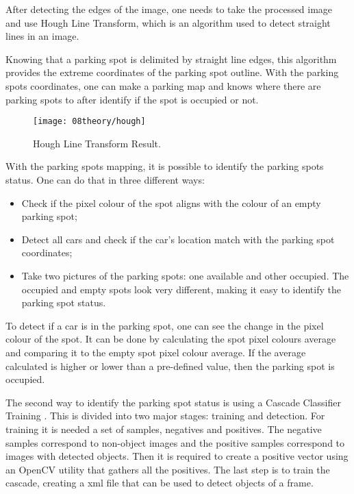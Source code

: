 After detecting the edges of the image, one needs to take the processed image and use Hough Line Transform, which is an algorithm used to detect straight lines in an image. \cite{hough} 

Knowing that a parking spot is delimited by straight line edges, this algorithm provides the extreme coordinates of the parking spot outline. With the parking spots coordinates, one can make a parking map and knows where there are parking spots to after identify if the spot is occupied or not.

\begin{figure}[H]
	\centering
	\texttt{[image: 08theory/hough]}
	\caption{Hough Line Transform Result.}
	\label{fig:hough}
\end{figure}


With the parking spots mapping, it is possible to identify the parking spots status. One can do that in three different ways:

\begin{itemize}
	\item Check if the pixel colour of the spot aligns with the colour of an empty parking spot;
	\item Detect all cars and check if the car's location match with the parking spot coordinates;
	\item Take two pictures of the parking spots: one available and other occupied. The occupied and empty spots look very different, making it easy to identify the parking spot status.
\end{itemize}


To detect if a car is in the parking spot, one can see the change in the pixel colour of the spot. It can be done by calculating the spot pixel colours average and comparing it to the empty spot pixel colour average. If the average calculated is higher or lower than a pre-defined value, then the parking spot is occupied.


The second way to identify the parking spot status is using a Cascade Classifier Training \cite{cascade}. This is divided into two major stages: training and detection. For training it is needed a set of samples, negatives and positives. The negative samples correspond to non-object images and the positive samples correspond to images with detected objects. Then it is required to create a positive vector using an OpenCV utility that gathers all the positives. The last step is to train the cascade, creating a \ac{xml} file that can be used to detect objects of a frame.
